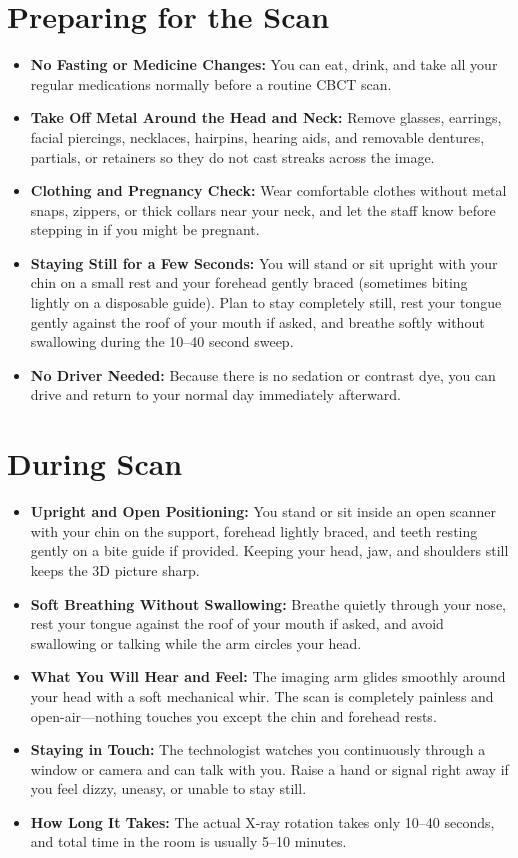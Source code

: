 \section{Preparing for the Scan}
\begin{itemize}
    \item \textbf{No Fasting or Medicine Changes:} You can eat, drink, and take all your regular medications normally before a routine CBCT scan.
    \item \textbf{Take Off Metal Around the Head and Neck:} Remove glasses, earrings, facial piercings, necklaces, hairpins, hearing aids, and removable dentures, partials, or retainers so they do not cast streaks across the image.
    \item \textbf{Clothing and Pregnancy Check:} Wear comfortable clothes without metal snaps, zippers, or thick collars near your neck, and let the staff know before stepping in if you might be pregnant.
    \item \textbf{Staying Still for a Few Seconds:} You will stand or sit upright with your chin on a small rest and your forehead gently braced (sometimes biting lightly on a disposable guide). Plan to stay completely still, rest your tongue gently against the roof of your mouth if asked, and breathe softly without swallowing during the 10--40 second sweep.
    \item \textbf{No Driver Needed:} Because there is no sedation or contrast dye, you can drive and return to your normal day immediately afterward.
\end{itemize}

\section{During Scan}
\begin{itemize}
    \item \textbf{Upright and Open Positioning:} You stand or sit inside an open scanner with your chin on the support, forehead lightly braced, and teeth resting gently on a bite guide if provided. Keeping your head, jaw, and shoulders still keeps the 3D picture sharp.
    \item \textbf{Soft Breathing Without Swallowing:} Breathe quietly through your nose, rest your tongue against the roof of your mouth if asked, and avoid swallowing or talking while the arm circles your head.
    \item \textbf{What You Will Hear and Feel:} The imaging arm glides smoothly around your head with a soft mechanical whir. The scan is completely painless and open-air---nothing touches you except the chin and forehead rests.
    \item \textbf{Staying in Touch:} The technologist watches you continuously through a window or camera and can talk with you. Raise a hand or signal right away if you feel dizzy, uneasy, or unable to stay still.
    \item \textbf{How Long It Takes:} The actual X-ray rotation takes only 10--40 seconds, and total time in the room is usually 5--10 minutes.
\end{itemize}

